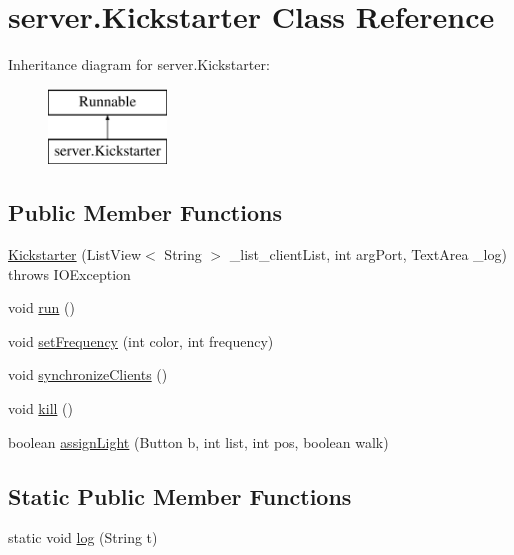 \hypertarget{classserver_1_1_kickstarter}{}\section{server.\+Kickstarter Class Reference}
\label{classserver_1_1_kickstarter}
Inheritance diagram for server.\+Kickstarter\+:\begin{figure}[H]
\begin{center}
\leavevmode
\includegraphics[height=2.000000cm]{classserver_1_1_kickstarter}
\end{center}
\end{figure}
\subsection*{Public Member Functions}
\begin{DoxyCompactItemize}
\item 
\hyperlink{classserver_1_1_kickstarter_a07a921c9b5b248b6c696fd84022126cc}{Kickstarter} (List\+View$<$ String $>$ \+\_\+list\+\_\+client\+List, int arg\+Port, Text\+Area \+\_\+log)  throws I\+O\+Exception
\item 
void \hyperlink{classserver_1_1_kickstarter_ab6d66e280ed60dafe8ca1f7b7d63b21e}{run} ()
\item 
void \hyperlink{classserver_1_1_kickstarter_a1b0a95c249c2e13bcc6218e3e24b3f29}{set\+Frequency} (int color, int frequency)
\item 
void \hyperlink{classserver_1_1_kickstarter_af04e25f1ce0ef4920bb044f0a0ad8b78}{synchronize\+Clients} ()
\item 
void \hyperlink{classserver_1_1_kickstarter_a5842570621b483e05c31d05fa593ee4a}{kill} ()
\item 
boolean \hyperlink{classserver_1_1_kickstarter_ac3e3c0348f02cc1a08cfa49a7990491d}{assign\+Light} (Button b, int list, int pos, boolean walk)
\end{DoxyCompactItemize}
\subsection*{Static Public Member Functions}
\begin{DoxyCompactItemize}
\item 
static void \hyperlink{classserver_1_1_kickstarter_ab976bbeaa74e2b6a9b61126707df9140}{log} (String t)
\end{DoxyCompactItemize}
